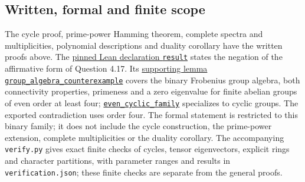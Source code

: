 \documentclass[10pt]{article}
\begin{document}
\subsection*{Written, formal and finite scope}
The cycle proof, prime-power Hamming theorem, complete spectra and
multiplicities, polynomial descriptions and duality corollary have the
written proofs above. The
\href{https://github.com/the-omega-institute/trureturing/blob/2eae85555e169007ff5548c46eb63cd2408f877f/D5/S3/ArithUnits/NguyenTanUnitaryCayleyPrimeSpectrum.lean#L669}{pinned Lean declaration
\texttt{result}} states the negation of the affirmative form of
Question 4.17. Its
\href{https://github.com/the-omega-institute/trureturing/blob/2eae85555e169007ff5548c46eb63cd2408f877f/D5/S3/ArithUnits/NguyenTanUnitaryCayleyPrimeSpectrum.lean#L631}{supporting lemma
\texttt{group\_algebra\_counterexample}} covers the binary Frobenius
group algebra, both connectivity properties, primeness and a zero
eigenvalue for finite abelian groups of even order at least four;
\href{https://github.com/the-omega-institute/trureturing/blob/2eae85555e169007ff5548c46eb63cd2408f877f/D5/S3/ArithUnits/NguyenTanUnitaryCayleyPrimeSpectrum.lean#L650}{\texttt{even\_cyclic\_family}}
specializes to cyclic groups. The exported contradiction uses order four.
The formal statement is restricted to this binary family; it does not
include the cycle construction, the prime-power extension, complete
multiplicities or the duality corollary. The accompanying
\texttt{verify.py} gives exact finite checks of cycles, tensor
eigenvectors, explicit rings and character partitions, with parameter
ranges and results in \texttt{verification.json}; these finite checks
are separate from the general proofs.
\end{document}
